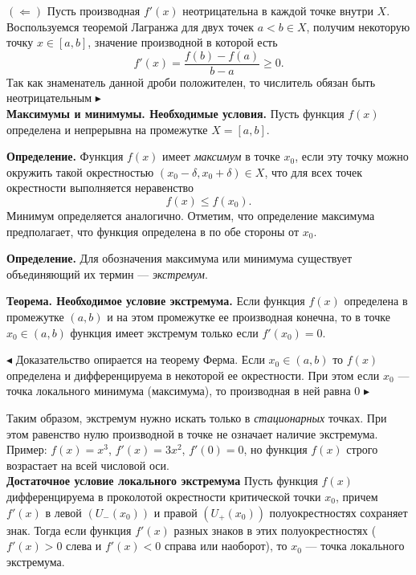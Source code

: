 \documentclass[12pt]{article}
\begin{document}
$(\Leftarrow)$ Пусть производная $f'(x)$ неотрицательна в каждой точке внутри $X$. Воспользуемся теоремой Лагранжа для двух точек $a < b \in X$, получим некоторую точку $x \in [a,b]$, значение производной в которой есть
$$
f'(x) = \frac{f(b)-f(a)}{b-a} \geq 0.
$$
Так как знаменатель данной дроби положителен, то числитель обязан быть неотрицательным $\blacktriangleright$ \\


\textbf{Максимумы и минимумы. Необходимые условия.}
Пусть функция $f(x)$ определена и непрерывна на промежутке $X = [a,b]$.

\textbf{Определение.} Функция $f(x)$ имеет \textit{максимум} в точке $x_0$, если эту точку можно окружить такой окрестностью $(x_0 - \delta, x_0 + \delta) \in X$, что для всех точек окрестности выполняется неравенство
$$
	f(x) \leq f(x_0).
$$
Минимум определяется аналогично. Отметим, что определение максимума предполагает, что функция определена в по обе стороны от $x_0$.

\textbf{Определение.} Для обозначения максимума или минимума существует объединяющий их термин --- \textit{экстремум}.

\textbf{Теорема. Необходимое условие экстремума.} Если функция $f(x)$ определена в промежутке $(a,b)$ и на этом промежутке ее производная конечна, то в точке $x_0 \in (a,b)$ функция имеет экстремум только если $f'(x_0) = 0$.

$\blacktriangleleft$ Доказательство опирается на теорему Ферма. Если $x_0 \in (a,b)$ то $f(x)$ определена и дифференцируема в некоторой ее окрестности. При этом если $x_0$ --- точка локального минимума (максимума), то производная в ней равна 0
$\blacktriangleright$ 

Таким образом, экстремум нужно искать только в \textit{стационарных} точках. При этом равенство нулю производной в точке не означает наличие экстремума. Пример: $f(x) = x^3$, $f'(x) = 3x^2$, $f'(0) = 0$, но функция $f(x)$ строго возрастает на всей числовой оси. \\


\textbf{Достаточное условие локального экстремума} Пусть функция $f(x)$ дифференцируема в проколотой окрестности критической точки $x_0$, причем $f'(x)$ в левой $(U_{-}(x_0))$ и правой $(U_{+}(x_0))$ полуокрестностях сохраняет знак. Тогда если функция $f'(x)$ разных знаков в этих полуокрестностях ($f'(x) > 0$ слева и $f'(x) < 0$  справа или наоборот), то $x_0$ --- точка локального экстремума. \\
\end{document}
